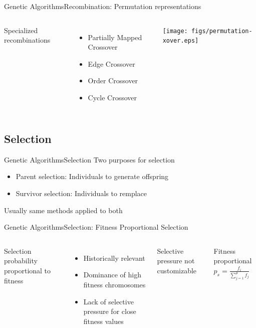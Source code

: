 \documentclass[10pt,compress]{beamer} %
\begin{document}
\begin{frame}{Genetic Algorithms}{Recombination: Permutation representations}
    \begin{columns}
		Specialized recombinations
		\begin{itemize}
		\item Partially Mapped Crossover
		\item Edge Crossover
		\item Order Crossover
		\item Cycle Crossover
		\end{itemize}

		\texttt{[image: figs/permutation-xover.eps]}
	\end{columns}
\end{frame}

\subsection{Selection}
\begin{frame}{Genetic Algorithms}{Selection}
	Two purposes for selection
	\begin{itemize}
		\item Parent selection: Individuals to generate offspring
		\item Survivor selection: Individuals to remplace
  	\end{itemize}
	Usually same methods applied to both
\end{frame}

\begin{frame}{Genetic Algorithms}{Selection: Fitness Proportional Selection}
    \begin{columns}
	Selection probability proportional to fitness 
	\begin{itemize}
	    \item Historically relevant
		\item Dominance of high fitness chromosomes
		\item Lack of selective pressure for close fitness values
  	\end{itemize}
		Selective pressure not customizable

	    \begin{block}{Fitness proportional}
	    $p_s = \frac{f_i}{\sum_{j=1}^\mu f_j}$
	    \end{block}

	\end{columns}
\end{frame}
\end{document}

